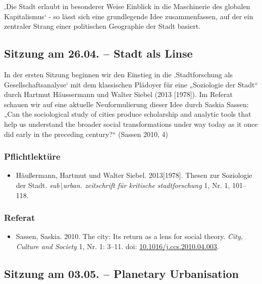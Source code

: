 \documentclass[
  ngerman,
]{article}
\providecommand{\tightlist}{%
  \setlength{\itemsep}{0pt}\setlength{\parskip}{0pt}}
\begin{document}
‚Die Stadt erlaubt in besonderer Weise Einblick in die Maschinerie des globalen Kapitalismus` - so lässt sich eine grundlegende Idee zusammenfassen, auf der ein zentraler Strang einer politischen Geographie der Stadt basiert.

\hypertarget{sitzung-am-26.04.-stadt-als-linse}{%
\subsection{Sitzung am 26.04. -- Stadt als Linse}\label{sitzung-am-26.04.-stadt-als-linse}}

In der ersten Sitzung beginnen wir den Einstieg in die ‚Stadtforschung als Gesellschaftsanalyse` mit dem klassischen Plädoyer für eine „Soziologie der Stadt`` durch Hartmut Häussermann und Walter Siebel (2013 {[}1978{]}). Im Referat schauen wir auf eine aktuelle Neuformulierung dieser Idee durch Saskia Sassen: „Can the sociological study of cities produce scholarship and analytic tools that help us understand the broader social transformations under way today as it once did early in the preceding century?{}`` (Sassen 2010, 4)

\hypertarget{pflichtlektuxfcre}{%
\subsubsection*{Pflichtlektüre}\label{pflichtlektuxfcre}}

\begin{itemize}
\tightlist
\item
  Häußermann, Hartmut und Walter Siebel. 2013{[}1978{]}. Thesen zur Soziologie der Stadt. \emph{sub\textbackslash urban. zeitschrift für kritische stadtforschung} 1, Nr. 1, 101--118.
\end{itemize}

\hypertarget{referat}{%
\subsubsection*{Referat}\label{referat}}

\begin{itemize}
\tightlist
\item
  Sassen, Saskia. 2010. The city: Its return as a lens for social theory. \emph{City, Culture and Society} 1, Nr. 1: 3--11. doi: \href{https://doi.org/10.1016/j.ccs.2010.04.003}{10.1016/j.ccs.2010.04.003}.
\end{itemize}

\hypertarget{sitzung-am-03.05.-planetary-urbanisation}{%
\subsection{Sitzung am 03.05. -- Planetary Urbanisation}\label{sitzung-am-03.05.-planetary-urbanisation}}
\end{document}
